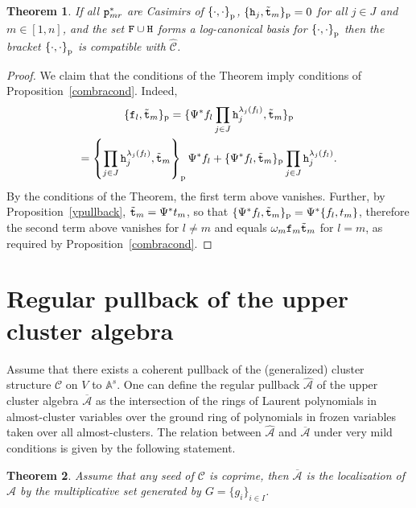 \documentclass{amsart}
\newtheorem{theorem}{Theorem}
\theoremstyle{definition}
\theoremstyle{remark}
\numberwithin{equation}{section}
\numberwithin{theorem}{section}
\def\A{{\mathcal A}}
\def\AA{{\mathbb A}}
\def\CC{{\mathcal C}}
\def\UU{\overline{\A}}
\def\ttf{{\tt f}}
\def\tth{{\tt h}}
\def\ttp{{\tt p}}
\def\ttt{{\tt t}}
\def\ttF{{\tt F}}
\def\ttH{{\tt H}}
\def\Poi{{\{\cdot,\cdot\}}}
\def\Poip{\Poi_{\rm p}}
\begin{document}
\begin{theorem}\label{compbra}
If all $\ttp_{mr}^*$ are Casimirs of $\Poip$, $\{\tth_j,\tilde\ttt_m\}_{\rm p}=0$ for all $j\in J$ and $m\in[1,n]$, and the set
$\ttF\cup\ttH$ forms a log-canonical basis for $\Poip$ then the
bracket $\Poip$ is compatible with $\widehat\CC$.
\end{theorem}

\begin{proof}
We claim that the conditions of the Theorem imply conditions of Proposition~\ref{combracond}. Indeed, 
\begin{multline*}
\{\ttf_l,\tilde\ttt_m\}_{\rm p}=\{\Psi^*f_l\prod_{j\in J}\tth_j^{\lambda_j(f_l)},\tilde\ttt_m\}_{\rm p}\\
=\left\{\prod_{j\in J}\tth_j^{\lambda_j(f_l)},\tilde\ttt_m\right\}_{\rm p}\Psi^*f_l+
\{\Psi^*f_l,\tilde\ttt_m\}_{\rm p}\prod_{j\in J}\tth_j^{\lambda_j(f_l)}.
\end{multline*}
By the conditions of the Theorem, the first term above vanishes. Further, 
by Proposition~\ref{ypullback}, $\tilde\ttt_m=\Psi^*t_m$, so that $\{\Psi^*f_l,\tilde\ttt_m\}_{\rm p}=\Psi^*\{f_l,t_m\}$,
therefore the second term above vanishes for $l\ne m$ and equals  $\omega_m \ttf_m\tilde\ttt_m$ for $l=m$, as required
by  Proposition~\ref{combracond}.
\end{proof}

\section{Regular pullback of the upper cluster algebra}\label{ucla}
Assume that there exists a coherent pullback of the (generalized) cluster structure $\CC$ on $V$ to $\AA^s$. One can define the regular pullback $\widehat{\A}$ of the
upper cluster algebra $\UU$ as the intersection of the rings of Laurent polynomials in almost-cluster variables 
over the ground ring of polynomials in frozen variables  
taken over all almost-clusters. The relation between $\widehat{\A}$ and $\UU$ under very mild conditions is given by the following statement.

\begin{theorem}\label{pullbackucla}
Assume that any seed of $\CC$ is coprime, then $\UU$ is the localization of $\widehat{\A}$ by the multiplicative set generated by $G=\{g_i\}_{i\in I}$.
\end{theorem}
\end{document}
